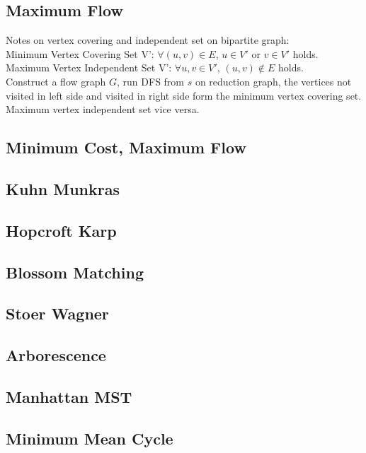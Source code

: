 \documentclass[10pt]{article}
\begin{document}
{\subsection{Maximum Flow}

Notes on vertex covering and independent set on bipartite graph:\\
Minimum Vertex Covering Set V': $\forall (u,v) \in E$, $u \in V'$ or $v \in V'$ holds. \\
Maximum Vertex Independent Set V': $\forall u,v \in V'$, $(u,v) \notin E$ holds.\\
Construct a flow graph $G$, run DFS from $s$ on reduction graph, the vertices not visited in left side and visited in right side form the minimum vertex covering set.\\
Maximum vertex independent set vice versa.\\
\subsection{Minimum Cost, Maximum Flow}

\subsection{Kuhn Munkras}

\subsection{Hopcroft Karp}

\subsection{Blossom Matching}

\subsection{Stoer Wagner}

\subsection{Arborescence}

\subsection{Manhattan MST}

\subsection{Minimum Mean Cycle}

}
\end{document}
